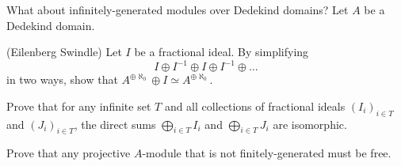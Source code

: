 \begin{problem}
What about infinitely-generated modules over 
Dedekind domains?
Let $A$ be a Dedekind domain.
\begin{alphenum}
\item (Eilenberg Swindle) Let $I$ be a fractional ideal.
By simplifying 
$$I\oplus I^{-1} \oplus I \oplus I^{-1} \oplus \dots$$
in two ways, show that $A^{\oplus \aleph_0}\oplus I 
\simeq A^{\oplus \aleph_0}$.
\item Prove that for any infinite set $T$ and 
all collections of fractional ideals 
$(I_i)_{i\in T}$ and $(J_i)_{i\in T}$, 
the direct sums $\bigoplus_{i\in T} I_i$ and 
$\bigoplus_{i\in T} J_i$ are isomorphic.
\item Prove that any projective $A$-module 
that is not finitely-generated must be free.
\end{alphenum}
\end{problem}